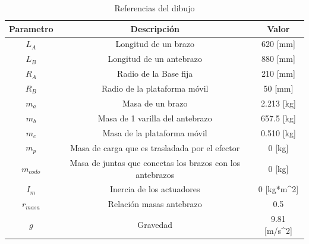 \newpage
        \renewcommand{\arraystretch}{2.0}
        \begin{table}[H]
        \centering
        \begin{tabular}{c c{4cm} c}
           \hline
           \textbf{Parametro}  & \multicolumn{1}{c}{\textbf{Descripción}} & Valor \\\hline\hline
            $L_A$  & Longitud de un brazo           & 620 [mm]                        \\\hline
            $L_B$  & Longitud de un antebrazo       & 880 [mm]                         \\\hline
            $R_A$  & Radio de la Base fija           & 210 [mm]                         \\\hline
            $R_B$  & Radio de la plataforma móvil    & 50 [mm]                         \\\hline
            $m_a$  & Masa de un brazo                & 2.213 [kg]                         \\\hline
            $m_b$  & Masa de 1 varilla del antebrazo  & 657.5 [kg]                         \\\hline
            $m_c$  & Masa de la plataforma móvil     & 0.510 [kg]                         \\\hline
            $m_p$  & Masa de carga que es trasladada por el efector & 0 [kg]           \\\hline
            $m_{codo}$  & Masa de juntas que conectas los brazos con los antebrazos  & 0 [kg]  \\\hline
            $I_m$  & Inercia de los actuadores           &   0 [kg*m^2]     \\\hline
            $r_{masa}$  & Relación masas antebrazo           & 0.5        \\\hline
            $g$  & Gravedad           & 9.81  [m/s^2]                      \\\hline

        \end{tabular}
        \caption{Referencias del dibujo}
        \label{tab:cap5_tabla_1}
    \end{table}
    \endgroup
